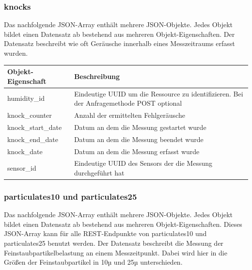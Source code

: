 \subsubsection{knocks}%
\label{sec:rest.json.knocks}
Das nachfolgende JSON-Array enthält mehrere JSON-Objekte. Jedes Objekt bildet einen Datensatz ab bestehend aus mehreren Objekt-Eigenschaften. Der Datensatz beschreibt wie oft Geräusche innerhalb eines Messzeitraums erfasst wurden.

\begin{jsoncode}
\end{jsoncode}

\begin{table}[H]
  \begin{tabularx}{\textwidth}{lX}
    \textbf{Objekt-Eigenschaft} & \textbf{Beschreibung} \\ \toprule
    humidity\_id                & Eindeutige UUID um die Ressource zu identifizieren. Bei der Anfragemethode POST optional  \\
    knock\_counter              & Anzahl der ermittelten Fehlgeräusche    \\
    knock\_start\_date          & Datum an dem die Messung gestartet wurde   \\
    knock\_end\_date            & Datum an dem die Messung beendet wurde   \\
    knock\_date                 & Datum an dem die Messung erfasst wurde \\
    sensor\_id                  & Eindeutige UUID des Sensors der die Messung durchgeführt hat
  \end{tabularx}
\end{table}

\subsubsection{particulates10 und particulates25}%
\label{sec:rest.json.particulates}
Das nachfolgende JSON-Array enthält mehrere JSON-Objekte. Jedes Objekt bildet einen Datensatz ab bestehend aus mehreren Objekt-Eigenschaften. Dieses JSON-Array kann für alle REST-Endpunkte von particulates10 und particulates25 benutzt werden. Der Datensatz beschreibt die Messung der Feinstaubpartikelbelastung an einem Messzeitpunkt. Dabei wird hier in die Größen der Feinstaubpartikel in 10µ und 25µ unterschieden.

